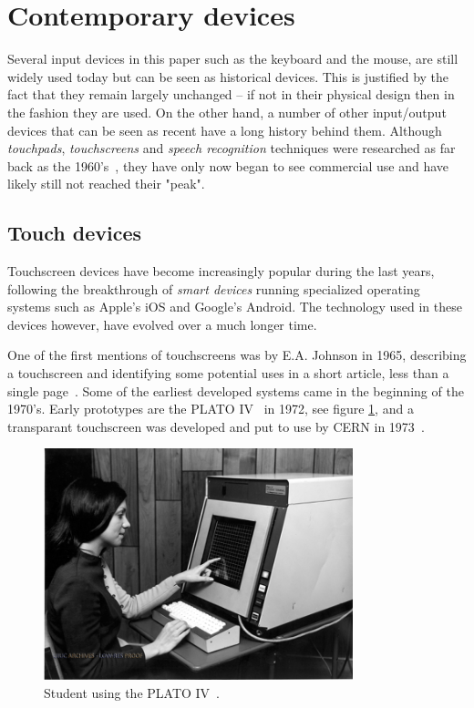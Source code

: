 \section{Contemporary devices}
\label{current}
Several input devices in this paper such as the keyboard and the mouse, are still widely used today but can be seen as historical devices. This is justified by the fact that they remain largely unchanged -- if not in their physical design then in the fashion they are used. On the other hand, a number of other input/output devices that can be seen as recent have a long history behind them. Although \emph{touchpads}, \emph{touchscreens} and \emph{speech recognition} techniques were researched as far back as the 1960's~\cite{buxton,shoebox}, they have only now began to see commercial use and have likely still not reached their "peak". 


\subsection{Touch devices}
Touchscreen devices have become increasingly popular during the last years, following the breakthrough of \emph{smart devices} running specialized operating systems such as Apple's iOS and Google's Android. The technology used in these devices however, have evolved over a much longer time.

One of the first mentions of touchscreens was by E.A. Johnson in 1965, describing a touchscreen and identifying some potential uses in a short article, less than a single page~\cite{4205802}. Some of the earliest developed systems came in the beginning of the 1970's. Early prototypes are the PLATO IV~\cite{buxton} in 1972, see figure \ref{platoIV}, and a transparant touchscreen was developed and put to use by CERN in 1973~\cite{cern}.

\begin{figure}[]
\center
\includegraphics[width=0.8\textwidth] {bilder/platoiv.jpg}
\caption{Student using the PLATO IV~\cite{platoiv}.}
\label{platoIV}
\end{figure}

